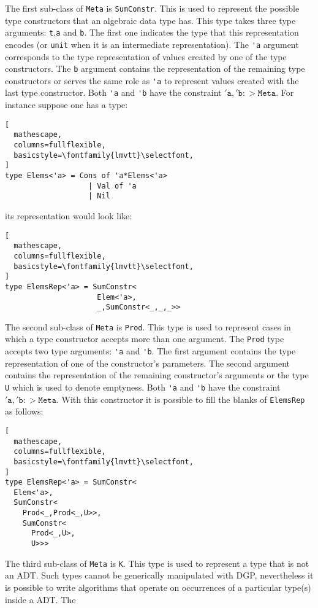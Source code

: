 \documentclass{sigplanconf}
\begin{document}
The first sub-class of \verb+Meta+ is \verb+SumConstr+. This is used
to represent the possible type constructors that an algebraic data
type has. This type takes three type arguments: \verb+t+,\verb+a+ and
\verb+b+. The first one indicates the type that this representation
encodes (or \verb+unit+ when it is an intermediate
representation). The \verb+'a+ argument corresponds to the type
representation of values created by one of the type constructors. The
\verb+b+ argument contains the representation of the remaining type
constructors or serves the same role as \verb+'a+ to represent values
created with the last type constructor. Both \verb+'a+ and \verb+'b+
have the constraint $\mathtt{'a},\mathtt{'b} :> \mathtt{Meta}$. For
instance suppose one has a type:
\begin{lstlisting}[
  mathescape,
  columns=fullflexible,
  basicstyle=\fontfamily{lmvtt}\selectfont,
]
type Elems<'a> = Cons of 'a*Elems<'a> 
                   | Val of 'a 
                   | Nil 
\end{lstlisting}
its representation would look like:
\begin{lstlisting}[
  mathescape,
  columns=fullflexible,
  basicstyle=\fontfamily{lmvtt}\selectfont,
]
type ElemsRep<'a> = SumConstr<
                     Elem<'a>,
                     _,SumConstr<_,_,_>>
\end{lstlisting}
The second sub-class of \verb+Meta+ is \verb+Prod+. This type is used
to represent cases in which a type constructor accepts more than one
argument. The \verb+Prod+ type accepts two type arguments: \verb+'a+
and \verb+'b+. The first argument contains the type representation of
one of the constructor's parameters. The second argument contains the
representation of the remaining constructor's arguments or the type
\verb+U+ which is used to denote emptyness. Both \verb+'a+ and
\verb+'b+ have the constraint $\mathtt{'a},\mathtt{'b} :>
\mathtt{Meta}$. With this constructor it is possible to fill the
blanks of \verb+ElemsRep+ as follows:
\begin{lstlisting}[
  mathescape,
  columns=fullflexible,
  basicstyle=\fontfamily{lmvtt}\selectfont,
]
type ElemsRep<'a> = SumConstr<
  Elem<'a>,
  SumConstr<
    Prod<_,Prod<_,U>>,
    SumConstr<
      Prod<_,U>,
      U>>>
\end{lstlisting}
The third sub-class of \verb+Meta+ is \verb+K+. This type is used to
represent a type that is not an ADT. Such types cannot be generically
manipulated with DGP, nevertheless it is possible to write algorithms
that operate on occurrences of a particular type(s) inside a ADT. The
\end{document}
